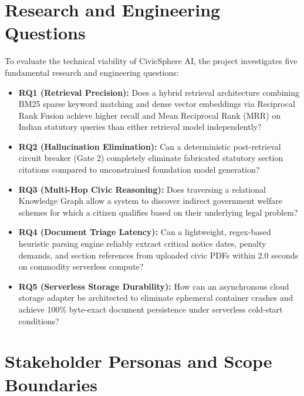 \section{Research and Engineering Questions}
\label{sec:research_questions}
To evaluate the technical viability of CivicSphere AI, the project investigates five fundamental research and engineering questions:
\begin{itemize}
    \item \textbf{RQ1 (Retrieval Precision):} Does a hybrid retrieval architecture combining BM25 sparse keyword matching and dense vector embeddings via Reciprocal Rank Fusion achieve higher recall and Mean Reciprocal Rank (MRR) on Indian statutory queries than either retrieval model independently?
    \item \textbf{RQ2 (Hallucination Elimination):} Can a deterministic post-retrieval circuit breaker (Gate 2) completely eliminate fabricated statutory section citations compared to unconstrained foundation model generation?
    \item \textbf{RQ3 (Multi-Hop Civic Reasoning):} Does traversing a relational Knowledge Graph allow a system to discover indirect government welfare schemes for which a citizen qualifies based on their underlying legal problem?
    \item \textbf{RQ4 (Document Triage Latency):} Can a lightweight, regex-based heuristic parsing engine reliably extract critical notice dates, penalty demands, and section references from uploaded civic PDFs within 2.0 seconds on commodity serverless compute?
    \item \textbf{RQ5 (Serverless Storage Durability):} How can an asynchronous cloud storage adapter be architected to eliminate ephemeral container crashes and achieve 100\% byte-exact document persistence under serverless cold-start conditions?
\end{itemize}

\section{Stakeholder Personas and Scope Boundaries}
\label{sec:scope_boundaries}

